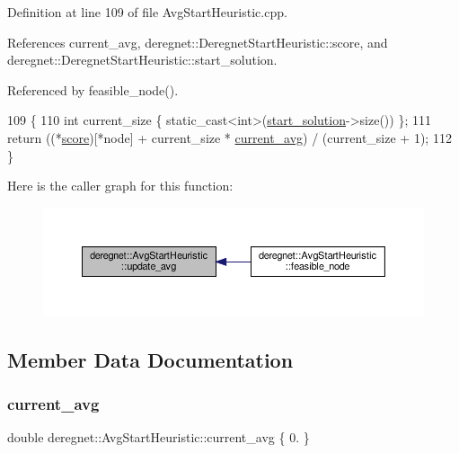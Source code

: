 Definition at line 109 of file Avg\+Start\+Heuristic.\+cpp.



References current\+\_\+avg, deregnet\+::\+Deregnet\+Start\+Heuristic\+::score, and deregnet\+::\+Deregnet\+Start\+Heuristic\+::start\+\_\+solution.



Referenced by feasible\+\_\+node().


\begin{DoxyCode}
109                                                \{
110     \textcolor{keywordtype}{int} current\_size \{ \textcolor{keyword}{static\_cast<}\textcolor{keywordtype}{int}\textcolor{keyword}{>}(\hyperlink{classderegnet_1_1DeregnetStartHeuristic_a7450e11ca0a265b055f95e7832b65e2f}{start\_solution}->size()) \};
111     \textcolor{keywordflow}{return} ((*\hyperlink{classderegnet_1_1DeregnetStartHeuristic_ae03300e79482975e98f95cba19ad32b0}{score})[*node] + current\_size * \hyperlink{classderegnet_1_1AvgStartHeuristic_a2c4b3fa6aa7946276404e650ea42fd14}{current\_avg}) / (current\_size + 1);
112 \}
\end{DoxyCode}
Here is the caller graph for this function\+:\nopagebreak
\begin{figure}[H]
\begin{center}
\leavevmode
\includegraphics[width=350pt]{classderegnet_1_1AvgStartHeuristic_ab3cbc873952af7525654194a7d5e59e0_icgraph}
\end{center}
\end{figure}


\subsection{Member Data Documentation}
\mbox{\label{classderegnet_1_1AvgStartHeuristic_a2c4b3fa6aa7946276404e650ea42fd14}} 
\subsubsection{\texorpdfstring{current\+\_\+avg}{current\_avg}}
{\footnotesize\ttfamily double deregnet\+::\+Avg\+Start\+Heuristic\+::current\+\_\+avg \{ 0. \}\hspace{0.3cm}{\ttfamily [private]}}



